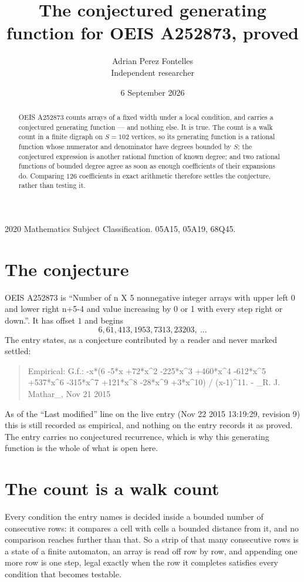 \documentclass[11pt,a4paper]{article}
\title{The conjectured generating function for OEIS A252873, proved}
\author{Adrian Perez Fontelles\\ \small Independent researcher}
\date{6 September 2026}
\theoremstyle{plain}
\theoremstyle{definition}
\begin{document}
\maketitle

\begin{abstract}
OEIS A252873 counts arrays of a fixed width under a local condition, and carries a conjectured
generating function --- and nothing else. It is true. The count is a walk count in a finite
digraph on $S=102$ vertices, so its generating function is a rational function whose numerator
and denominator have degrees bounded by $S$; the conjectured expression is another rational
function of known degree; and two rational functions of bounded degree agree as soon as enough
coefficients of their expansions do. Comparing $126$ coefficients in exact arithmetic
therefore settles the conjecture, rather than testing it.
\end{abstract}

\noindent\small 2020 Mathematics Subject Classification. 05A15, 05A19, 68Q45.\normalsize

\section{The conjecture}

OEIS A252873 is ``Number of n X 5 nonnegative integer arrays with upper left 0 and lower right n+5-4 and value increasing by 0 or 1 with every step right or down.''. It has offset $1$ and begins
\[
6, 61, 413, 1953, 7313, 23203,\ \dots
\]
The entry states, as a conjecture contributed by a reader and never marked settled:
\begin{quote}
Empirical: G.f.: -x*(6 -5*x +72*x\^{}2 -225*x\^{}3 +460*x\^{}4 -612*x\^{}5 +537*x\^{}6 -315*x\^{}7 +121*x\^{}8 -28*x\^{}9 +3*x\^{}10) / (x-1)\^{}11. - \_R. J. Mathar\_, Nov 21 2015
\end{quote}
As of the ``Last modified'' line on the live entry (Nov 22 2015 13:19:29, revision 9) this is still
recorded as empirical, and nothing on the entry records it as proved. The entry carries no
conjectured recurrence, which is why this generating function is the whole of what is open
here.

\section{The count is a walk count}

Every condition the entry names is decided inside a bounded number of consecutive rows: it
compares a cell with cells a bounded distance from it, and no comparison reaches further than
that. So a strip of that many consecutive rows is a state of a finite automaton, an array is
read off row by row, and appending one more row is one step, legal exactly when the row it
completes satisfies every condition that becomes testable.
\end{document}
